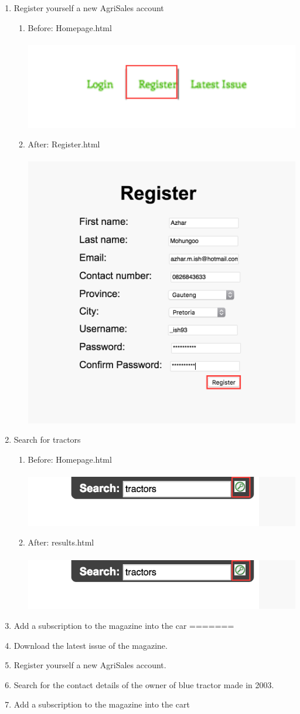 \documentclass[11pt]{article}
\begin{document}
\begin{enumerate}
\begin{enumerate}
			\end{enumerate} \newpage
		\item Register yourself a new AgriSales account
			\begin{enumerate}
				\item Before: Homepage.html \\ \\
					\includegraphics[width=0.7\linewidth]{../Images/Tasks/Task3Before}
				\item After: Register.html \\ \\
					\includegraphics[width=0.5\linewidth]{../Images/Tasks/Task3After}
			\end{enumerate}
		\item Search for tractors
			\begin{enumerate}
				\item Before: Homepage.html \\ \\
					\includegraphics[width=0.8\linewidth]{../Images/Tasks/Task4Before}
				\item After: results.html \\ \\
					\includegraphics[width=0.5\linewidth]{../Images/Tasks/Task4Before}
			\end{enumerate}
		\item Add a subscription to the magazine into the car
=======
		\item Download the latest issue of the magazine.
		\item Register yourself a new AgriSales account.
		\item Search for the contact details of the owner of blue tractor made in 2003.
		\item Add a subscription to the magazine into the cart

\end{enumerate}
\end{document}
